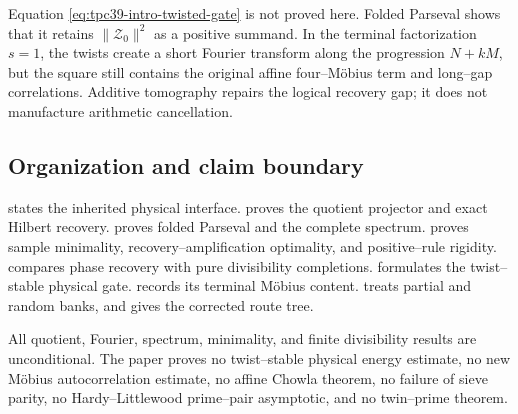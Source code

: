 Equation \eqref{eq:tpc39-intro-twisted-gate} is not proved here.  Folded
Parseval shows that it retains \(\|\mathscr Z_0\|^2\) as a positive
summand.  In the terminal factorization \(s=1\), the twists create a
short Fourier transform along the progression \(N+kM\), but the square
still contains the original affine four--M\"obius term and long--gap
correlations.  Additive tomography repairs the logical recovery gap; it
does not manufacture arithmetic cancellation.

\subsection{Organization and claim boundary}

 states the inherited physical interface.
 proves the quotient projector and exact Hilbert
recovery.   proves folded Parseval and the complete
spectrum.   proves sample minimality,
recovery--amplification optimality, and positive--rule rigidity.
 compares phase recovery with pure
divisibility completions.   formulates the
twist--stable physical gate.   records its
terminal M\"obius content.   treats partial
and random banks, and  gives the corrected route
tree.

All quotient, Fourier, spectrum, minimality, and finite divisibility
results are unconditional.  The paper proves no twist--stable physical
energy estimate, no new M\"obius autocorrelation estimate, no affine
Chowla theorem, no failure of sieve parity, no Hardy--Littlewood
prime--pair asymptotic, and no twin--prime theorem.

